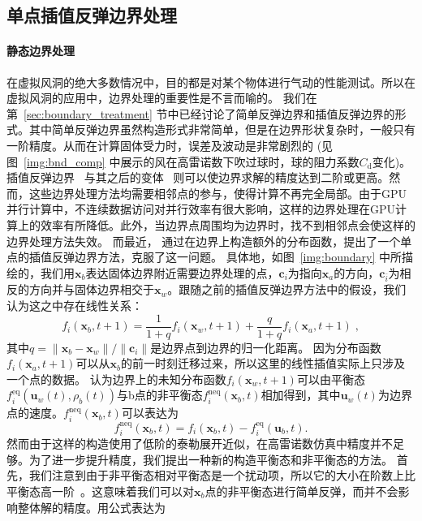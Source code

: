 \subsection{单点插值反弹边界处理}
\paragraph{静态边界处理}
在虚拟风洞的绝大多数情况中，目的都是对某个物体进行气动的性能测试。所以在虚拟风洞的应用中，边界处理的重要性是不言而喻的。
我们在第~\ref{sec:boundary_treatment} 节中已经讨论了简单反弹边界和插值反弹边界的形式。其中简单反弹边界虽然构造形式非常简单，但是在边界形状复杂时，一般只有一阶精度。从而在计算固体受力时，误差及波动是非常剧烈的 (见图~\ref{img:bnd_comp} 中展示的风在高雷诺数下吹过球时，球的阻力系数$C_\text{d}$变化)。
插值反弹边界~\citep{Bouzidi-2001} 与其之后的变体~\citep{Yu-2003, Ginzburg-2003, Chun-2007} 则可以使边界求解的精度达到二阶或更高。然而，这些边界处理方法均需要相邻点的参与，使得计算不再完全局部。由于GPU并行计算中，不连续数据访问对并行效率有很大影响，这样的边界处理在GPU计算上的效率有所降低。此外，当边界点周围均为边界时，找不到相邻点会使这样的边界处理方法失效。
而最近，\citet{Tao-2018-b} 通过在边界上构造额外的分布函数，提出了一个单点的插值反弹边界方法，克服了这一问题。
具体地，如图~\ref{img:boundary} 中所描绘的，我们用$\bm{x}_{b}$表达固体边界附近需要边界处理的点，$\bm{c}_{i}$为指向$\bm{x}_{a}$的方向，$\bm{c}_{\bar{i}}$为相反的方向并与固体边界相交于$\bm{x}_{w}$。跟随之前的插值反弹边界方法中的假设，我们认为这之中存在线性关系：
\begin{equation}
f_i(\bm{x}_b, t\!+\!1) = \frac{1}{1+q}f_{i}(\bm{x}_w, t\!+\!1)+ \frac{q}{1+q}f_{i}(\bm{x}_a, t\!+\!1) \;,
\end{equation}
其中$q=\|\bm{x}_b - \bm{x}_w\|/\|\bm{c}_i\|$是边界点到边界的归一化距离。
因为分布函数$f_{i}(\bm{x}_a, t+1)$可以从$\bm{x}_b$的前一时刻迁移过来，所以这里的线性插值实际上只涉及一个点的数据。
\citet{Tao-2018-b} 认为边界上的未知分布函数$f_{i}(\bm{x}_w, t\!+\!1)$可以由平衡态$f_{i}^\text{eq}(\bm{u}_w(t), \rho_b(t))$与b点的非平衡态$f_{i}^\text{neq}(\bm{x}_b, t)$相加得到，其中$\bm{u}_w(t)$为边界点的速度。$f_{i}^\text{neq}(\bm{x}_b, t)$可以表达为
\begin{equation}
f_{i}^\text{neq}(\bm{x}_b, t) = f_{i}(\bm{x}_b, t) - f_{i}^\text{eq}(\bm{u}_b, t).
\end{equation}
然而由于这样的构造使用了低阶的泰勒展开近似，在高雷诺数仿真中精度并不足够。为了进一步提升精度，我们提出一种新的构造平衡态和非平衡态的方法。
首先，我们注意到由于非平衡态相对平衡态是一个扰动项，所以它的大小在阶数上比平衡态高一阶~\citep{Chun-2007}。这意味着我们可以对$\bm{x}_b$点的非平衡态进行简单反弹，而并不会影响整体解的精度。用公式表达为
